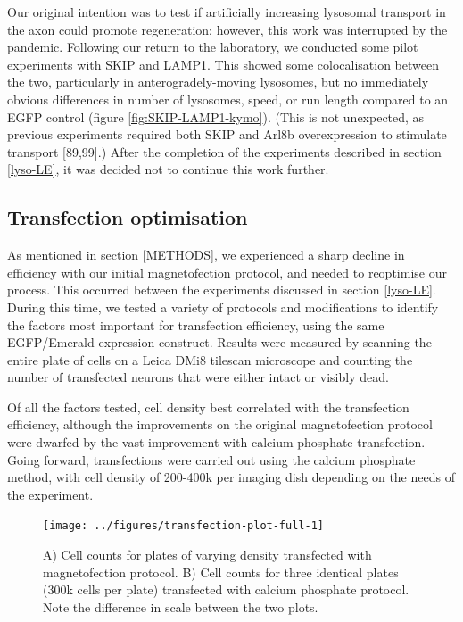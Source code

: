 \documentclass[
  12pt,
  a4paper,
]{book}
\begin{document}
Our original intention was to test if artificially increasing lysosomal transport in the axon could promote regeneration; however, this work was interrupted by the pandemic. Following our return to the laboratory, we conducted some pilot experiments with SKIP and LAMP1. This showed some colocalisation between the two, particularly in anterogradely-moving lysosomes, but no immediately obvious differences in number of lysosomes, speed, or run length compared to an EGFP control (figure \ref{fig:SKIP-LAMP1-kymo}). (This is not unexpected, as previous experiments required both SKIP and Arl8b overexpression to stimulate transport {[}89,99{]}.) After the completion of the experiments described in section \ref{lyso-LE}, it was decided not to continue this work further.

\hypertarget{transfection-optimisation}{%
\subsection{Transfection optimisation}\label{transfection-optimisation}}

As mentioned in section \ref{METHODS}, we experienced a sharp decline in efficiency with our initial magnetofection protocol, and needed to reoptimise our process. This occurred between the experiments discussed in section \ref{lyso-LE}. During this time, we tested a variety of protocols and modifications to identify the factors most important for transfection efficiency, using the same EGFP/Emerald expression construct. Results were measured by scanning the entire plate of cells on a Leica DMi8 tilescan microscope and counting the number of transfected neurons that were either intact or visibly dead.

Of all the factors tested, cell density best correlated with the transfection efficiency, although the improvements on the original magnetofection protocol were dwarfed by the vast improvement with calcium phosphate transfection. Going forward, transfections were carried out using the calcium phosphate method, with cell density of 200-400k per imaging dish depending on the needs of the experiment.

\begin{figure}[h]
\texttt{[image: ../figures/transfection-plot-full-1]} \caption[Transfection optimisation plot]{A) Cell counts for plates of varying density transfected with magnetofection protocol.  B) Cell counts for three identical plates (300k cells per plate) transfected with calcium phosphate protocol.  Note the difference in scale between the two plots.}\label{fig:transfection-plot-full}
\end{figure}
\end{document}
